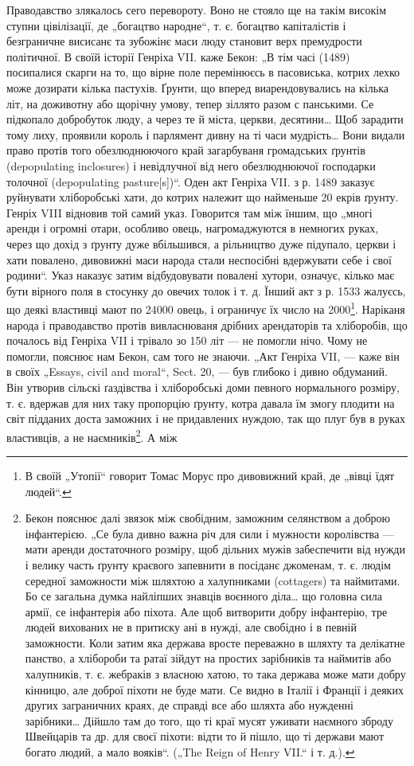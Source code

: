 Праводавство злякалось сего перевороту. Воно не стояло ще на такім високім ступни цівілізації, де
„богацтво народне“, т. є. богацтво капіталістів і безграничне висисанє та зубожінє маси люду
становит верх премудрости
політичної. В своїй історії Генріха VII. каже Бекон: „В тім часі (1489) посипалися скарги на то, що
вірне поле перемінюєсь в пасовиська, котрих лехко може дозирати кілька пастухів. Ґрунти, що вперед
виарендовувались на кілька літ, на доживотну або щорічну умову, тепер зіллято разом
с панськими. Се підкопало добробуток люду, а через те й міста, церкви, десятини\dots{} Щоб зарадити
тому лиху, проявили король і парлямент дивну на ті часи мудрість\dots{} Вони видали право протів того
обезлюднюючого край загарбуваня громадських ґрунтів (depopulating inclosures) і невідлучної
від него обезлюднюючої ґосподарки толочної (depopulating pasture[s])“. Оден акт Генріха VII. з р.
1489 заказує руйнувати хліборобські хати, до котрих належит що найменьше 20 екрів ґрунту. Генріх
VIII відновив той самий указ. Говорится там між їншим, що „многі аренди і огромні отари, особливо
овець, нагромаджуются в немногих руках, через що дохід
з ґрунту дуже вбільшився, а рільництво дуже підупало, церкви і хати повалено, дивовижні маси народа
стали неспосібні вдержувати себе і свої родини“. Указ наказує затим відбудовувати повалені хутори,
означує, кілько має бути вірного поля в стосунку до овечих толок і т. д. Їнший акт з р. 1533
жалуєсь, що деякі властивці мают по 24000 овець, і ограничує їх число на 2000\footnote{
В своїй „Утопії“ говорит Томас Морус про дивовижний край, де
„вівці їдят людей“.
}. Наріканя народа і
праводавство протів вивласнюваня дрібних арендаторів та хліборобів, що почалось від Генріха VII і
трівало зо 150 літ
— не помогли нічо. Чому не помогли, пояснює нам Бекон, сам того не знаючи. „Акт Генріха VII, — каже
він в своїх „Essays, civil and moral“, Sect. 20, — був глибоко і дивно обдуманий. Він утворив
сільскі ґаздівства і хліборобські доми певного нормального розміру, т. є. вдержав для них таку
пропорцію ґрунту, котра давала їм змогу плодити на світ підданих доста заможних і не придавлених
нуждою, так що плуг був в руках властивців, а не наємників\footnote{
Бекон пояснює далі звязок між свобідним, заможним селянством
а доброю інфантерією. „Се була дивно важна річ для сили і мужности
королівства — мати аренди достаточного розміру, щоб дільних мужів
забеспечити від нужди і велику часть ґрунту краєвого запевнити в посіданє джоменам, т. є. людім
середної заможности між шляхтою а халупниками (cottagers) та наймитами. Бо се загальна думка
найліпших знавців воєнного діла\dots{} що головна сила армії, се інфантерія або піхота. Але щоб
витворити добру інфантерію, тре людей вихованих не в притиску ані в нужді, але свобідно і в певній
заможности. Коли затим яка держава вросте переважно в шляхту та делікатне панство, а хлібороби та
ратаї зійдут на простих зарібників та наймитів або халупників, т. є. жебраків з власною хатою, то
така держава може мати добру кінницю, але доброї піхоти не буде мати. Се видно в Італії і Франції і
деяких других заграничних краях, де справді все або шляхта або нужденні зарібники\dots{} Дійшло там до
того, що ті краї мусят уживати наємного зброду Швейцарів та др. для своєї піхоти: відти то й пішло,
що ті держави мают богато людий, а мало вояків“. („The Reign of Henry VII.“ і т. д.).
}. А між
\parbreak{}
